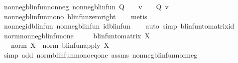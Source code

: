 \begin{isabellebody}
\endisatagproof
{\isafoldproof}%
%
\isadelimproof
\isanewline
%
\endisadelimproof
\isanewline
{}\isamarkupfalse%
\ nonneg{\isacharunderscore}{\kern0pt}blinfun{\isacharunderscore}{\kern0pt}nonneg{\isacharcolon}{\kern0pt}\ {\isachardoublequoteopen}nonneg{\isacharunderscore}{\kern0pt}blinfun\ Q\ {\isasymLongrightarrow}\ {}\ {\isasymle}\ v\ {\isasymLongrightarrow}\ {}\ {\isasymle}\ Q\ v{\isachardoublequoteclose}\isanewline
%
\isadelimproof
\ \ %
\endisadelimproof
%
\isatagproof
{}\isamarkupfalse%
\ nonneg{\isacharunderscore}{\kern0pt}blinfun{\isacharunderscore}{\kern0pt}mono\ blinfun{\isachardot}{\kern0pt}zero{\isacharunderscore}{\kern0pt}right\isanewline
\ \ \isamarkupfalse%
\ metis%
\endisatagproof
{\isafoldproof}%
%
\isadelimproof
\isanewline
%
\endisadelimproof
\isanewline
{}\isamarkupfalse%
\ nonneg{\isacharunderscore}{\kern0pt}id{\isacharunderscore}{\kern0pt}blinfun{\isacharcolon}{\kern0pt}\ {\isachardoublequoteopen}nonneg{\isacharunderscore}{\kern0pt}blinfun\ id{\isacharunderscore}{\kern0pt}blinfun{\isachardoublequoteclose}\isanewline
%
\isadelimproof
\ \ %
\endisadelimproof
%
\isatagproof
{}\isamarkupfalse%
\ {\isacharparenleft}{\kern0pt}auto\ simp{\isacharcolon}{\kern0pt}\ blinfun{\isacharunderscore}{\kern0pt}to{\isacharunderscore}{\kern0pt}matrix{\isacharunderscore}{\kern0pt}id{\isacharparenright}{\kern0pt}%
\endisatagproof
{\isafoldproof}%
%
\isadelimproof
\isanewline
%
\endisadelimproof
\isanewline
{}\isamarkupfalse%
\ norm{\isacharunderscore}{\kern0pt}nonneg{\isacharunderscore}{\kern0pt}blinfun{\isacharunderscore}{\kern0pt}one{\isacharcolon}{\kern0pt}\isanewline
\ \ \ {\isachardoublequoteopen}{}\ {\isasymle}\ blinfun{\isacharunderscore}{\kern0pt}to{\isacharunderscore}{\kern0pt}matrix\ X{\isachardoublequoteclose}\isanewline
\ \ \ {\isachardoublequoteopen}norm\ X\ {\isacharequal}{\kern0pt}\ norm\ {\isacharparenleft}{\kern0pt}blinfun{\isacharunderscore}{\kern0pt}apply\ X\ {}{\isacharparenright}{\kern0pt}{\isachardoublequoteclose}\isanewline
%
\isadelimproof
\ \ %
\endisadelimproof
%
\isatagproof
{}\isamarkupfalse%
\ {\isacharparenleft}{\kern0pt}simp\ add{\isacharcolon}{\kern0pt}\ norm{\isacharunderscore}{\kern0pt}blinfun{\isacharunderscore}{\kern0pt}mono{\isacharunderscore}{\kern0pt}eq{\isacharunderscore}{\kern0pt}one\ assms\ nonneg{\isacharunderscore}{\kern0pt}blinfun{\isacharunderscore}{\kern0pt}nonneg{\isacharparenright}{\kern0pt}%
\endisatagproof
{\isafoldproof}%

\end{isabellebody}
